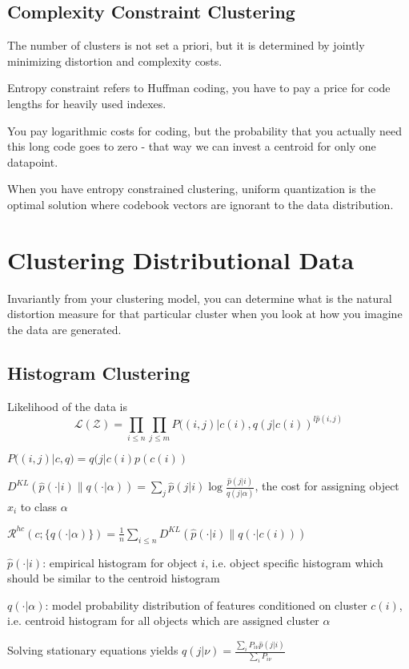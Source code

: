 \documentclass[12pt]{article}
\begin{document}
\subsection{Complexity Constraint Clustering}
The number of clusters is not set a priori, but it is determined by jointly minimizing distortion and complexity costs.
\par Entropy constraint refers to Huffman coding, you have to pay a price for code lengths for heavily used indexes.
\par You pay logarithmic costs for coding, but the probability that you actually need this long code goes to zero - that way we can invest a centroid for only one datapoint.
\par When you have entropy constrained clustering, uniform quantization is the optimal solution where codebook vectors are ignorant to the data distribution.

\section{Clustering Distributional Data}
Invariantly from your clustering model, you can determine what is the natural distortion measure for that particular cluster when you look at how you imagine the data are generated.

\subsection{Histogram Clustering}
\ulb
\item Likelihood of the data is
\[ \mathcal{L}(\mathcal{Z}) = \prod_{i \leq n} \prod_{j \leq m} P ((i,j)|c(i),q(j|c(i))^{l\hat{p}(i,j)} \]
\item $P ((i,j)|c,q) = q(j|c(i) p(c(i))$
\item $D^{KL}( \hat{p}(\cdot|i)\parallel q(\cdot|\alpha)) = \sum_j \hat{p}(j|i)\log \frac{\hat{p}(j|i)}{q(j|\alpha)}$, the cost for assigning object $x_i$ to class $\alpha$
\item $\mathcal{R}^{hc} (c; \{ q(\cdot|\alpha) \}) = \frac{1}{n} \sum_{i \leq n} D^{KL}( \hat{p}(\cdot|i)\parallel q(\cdot|c(i)) )$
\item $\hat{p}(\cdot|i)$: empirical histogram for object $i$, i.e. object specific histogram which should be similar to the centroid histogram
\item $q(\cdot|\alpha)$: model probability distribution of features conditioned on cluster $c(i)$, i.e. centroid histogram for all objects which are assigned cluster $\alpha$
\item Solving stationary equations yields $q(j|\nu)=\frac{\sum_i P_{i\nu} \hat{p}(j|i)}{\sum_i P_{i\nu}}$
\ule
\end{document}
